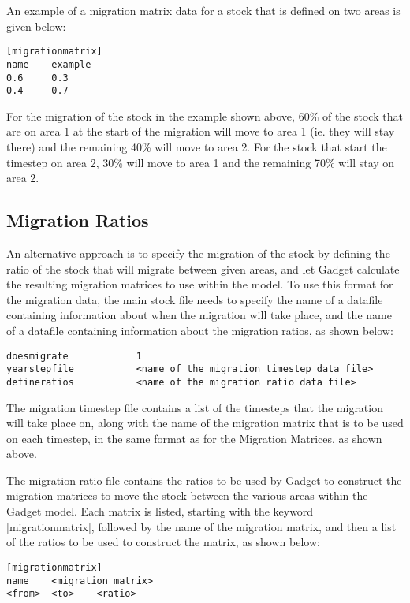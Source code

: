 \documentclass[10pt,twoside]{book}
\begin{document}
\bigskip
An example of a migration matrix data for a stock that is defined on two areas is given below:

{\small\begin{verbatim}
[migrationmatrix]
name    example
0.6     0.3
0.4     0.7
\end{verbatim}}

For the migration of the stock in the example shown above, 60\% of the stock that are on area 1 at the start of the migration will move to area 1 (ie. they will stay there) and the remaining 40\% will move to area 2.  For the stock that start the timestep on area 2, 30\% will move to area 1 and the remaining 70\% will stay on area 2.

\subsection{Migration Ratios}
An alternative approach is to specify the migration of the stock by defining the ratio of the stock that will migrate between given areas, and let Gadget calculate the resulting migration matrices to use within the model.  To use this format for the migration data, the main stock file needs to specify the name of a datafile containing information about when the migration will take place, and the name of a datafile containing information about the migration ratios, as shown below:

{\small\begin{verbatim}
doesmigrate            1
yearstepfile           <name of the migration timestep data file>
defineratios           <name of the migration ratio data file>
\end{verbatim}}

The migration timestep file contains a list of the timesteps that the migration will take place on, along with the name of the migration matrix that is to be used on each timestep, in the same format as for the Migration Matrices, as shown above.

\bigskip
The migration ratio file contains the ratios to be used by Gadget to construct the migration matrices to move the stock between the various areas within the Gadget model.  Each matrix is listed, starting with the keyword [migrationmatrix], followed by the name of the migration matrix, and then a list of the ratios to be used to construct the matrix, as shown below:

{\small\begin{verbatim}
[migrationmatrix]
name    <migration matrix>
<from>  <to>    <ratio>
\end{verbatim}}
\end{document}
